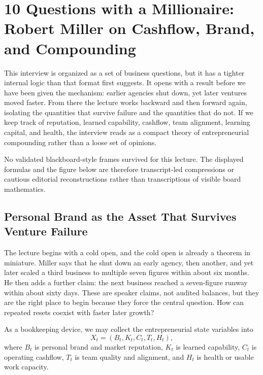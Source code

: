 \chapter{10 Questions with a Millionaire: Robert Miller on Cashflow, Brand, and Compounding}

This interview is organized as a set of business questions, but it has a tighter internal logic than that format first suggests. It opens with a result before we have been given the mechanism: earlier agencies shut down, yet later ventures moved faster. From there the lecture works backward and then forward again, isolating the quantities that survive failure and the quantities that do not. If we keep track of reputation, learned capability, cashflow, team alignment, learning capital, and health, the interview reads as a compact theory of entrepreneurial compounding rather than a loose set of opinions.

\begin{remark}
No validated blackboard-style frames survived for this lecture. The displayed formulas and the figure below are therefore transcript-led compressions or cautious editorial reconstructions rather than transcriptions of visible board mathematics.
\end{remark}

\section{Personal Brand as the Asset That Survives Venture Failure}

The lecture begins with a cold open, and the cold open is already a theorem in miniature. Miller says that he shut down an early agency, then another, and yet later scaled a third business to multiple seven figures within about six months. He then adds a further claim: the next business reached a seven-figure runway within about sixty days. These are speaker claims, not audited balances, but they are the right place to begin because they force the central question. How can repeated resets coexist with faster later growth?

As a bookkeeping device, we may collect the entrepreneurial state variables into
\begin{equation}
X_t=(B_t,K_t,C_t,T_t,H_t),
\end{equation}
where \(B_t\) is personal brand and market reputation, \(K_t\) is learned capability, \(C_t\) is operating cashflow, \(T_t\) is team quality and alignment, and \(H_t\) is health or usable work capacity.

